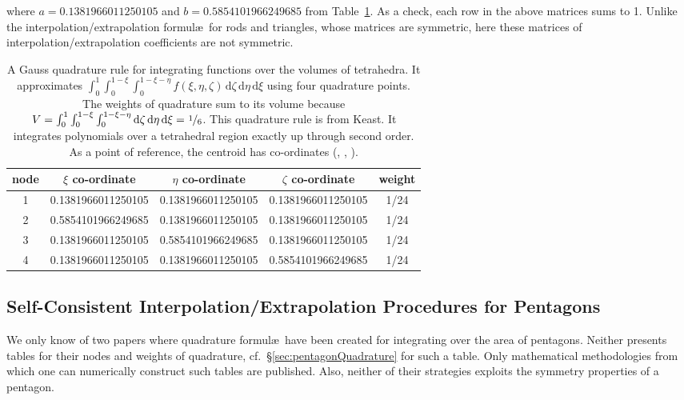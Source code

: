 where $a = 0.1381966011250105$ and $b = 0.5854101966249685$ from Table~\ref{tab:4nodedTet}.  As a check, each row in the above matrices sums to 1.  Unlike the interpolation\slash extrapolation formul\ae\ for rods and triangles, whose matrices are symmetric, here these matrices of interpolation\slash extrapolation coefficients are not symmetric. 
    
\begin{table}
    \hspace{-7mm}
    \begin{tabular}{|c|cccc|}
        \hline
        node & $\xi$ co-ordinate & $\eta$ co-ordinate & 
        $\zeta$ co-ordinate & weight \\ \hline        
        1 & 0.1381966011250105 & 0.1381966011250105 & 0.1381966011250105 & 1/24 \\
        2 & 0.5854101966249685 & 0.1381966011250105 & 0.1381966011250105 & 1/24 \\
        3 & 0.1381966011250105 & 0.5854101966249685 & 0.1381966011250105 & 1/24 \\
        4 & 0.1381966011250105 & 0.1381966011250105 & 0.5854101966249685 & 1/24 \\
        \hline
    \end{tabular}
    \caption{A Gauss quadrature rule for integrating functions over the volumes of tetrahedra.  It approximates $\int_0^1 \int_0^{1-\xi} \int_0^{1-\xi-\eta} f(\xi, \eta, \zeta) \, \mathrm{d}\zeta \, \mathrm{d}\eta \, \mathrm{d}\xi$ using four quadrature points.  The weights of quadrature sum to its volume because $V = \int_0^1 \int_0^{1-\xi} \int_0^{1-\xi-\eta} \mathrm{d}\zeta \, \mathrm{d}\eta \, \mathrm{d}\xi = \textfrac{1}{6}$.  This quadrature rule is from Keast.  It integrates polynomials over a tetrahedral region exactly up through second order.  As a point of reference, the centroid has co-ordinates (, , ).}
    \label{tab:4nodedTet}
\end{table}

\subsection{Self-Consistent Interpolation\slash Extrapolation Procedures for Pentagons}

We only know of two papers where quadrature formul\ae\ have been created for integrating over the area of pentagons. \cite{Mousavietal10,Chakrabortyetal18}  Neither presents tables for their nodes and weights of quadrature, cf.\ \S\ref{sec:pentagonQuadrature} for such a table.  Only mathematical methodologies from which one can numerically construct such tables are published.  Also, neither of their strategies exploits the symmetry properties of a pentagon.  

